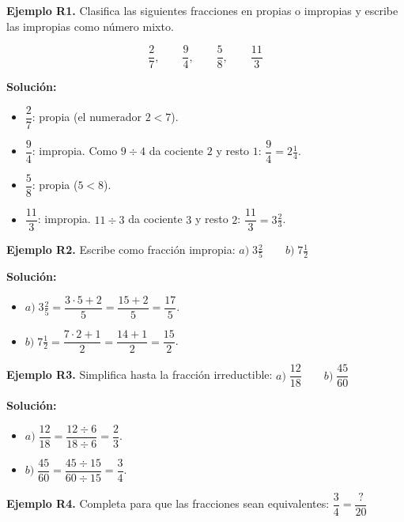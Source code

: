 \documentclass[12pt, letterpaper]{article}
\begin{document}
\textbf{Ejemplo R1.} Clasifica las siguientes fracciones en propias o impropias y escribe las impropias como número mixto.

$$\frac{2}{7}, \qquad \frac{9}{4}, \qquad \frac{5}{8}, \qquad \frac{11}{3}$$

\begin{cuadrosolucion}
  \textbf{Solución:}
  \begin{itemize}
    \item $\dfrac{2}{7}$: propia (el numerador $2 < 7$).
    \item $\dfrac{9}{4}$: impropia. Como $9 \div 4$ da cociente $2$ y resto $1$: $\dfrac{9}{4} = 2\frac{1}{4}$.
    \item $\dfrac{5}{8}$: propia ($5 < 8$).
    \item $\dfrac{11}{3}$: impropia. $11 \div 3$ da cociente $3$ y resto $2$: $\dfrac{11}{3} = 3\frac{2}{3}$.
  \end{itemize}
\end{cuadrosolucion}

\textbf{Ejemplo R2.} Escribe como fracción impropia: $a) \; 3\frac{2}{5} \qquad b) \; 7\frac{1}{2}$

\begin{cuadrosolucion}
  \textbf{Solución:}
  \begin{itemize}
    \item $a) \; 3\frac{2}{5} = \dfrac{3 \cdot 5 + 2}{5} = \dfrac{15 + 2}{5} = \dfrac{17}{5}$.
    \item $b) \; 7\frac{1}{2} = \dfrac{7 \cdot 2 + 1}{2} = \dfrac{14 + 1}{2} = \dfrac{15}{2}$.
  \end{itemize}
\end{cuadrosolucion}

\newpage %

\textbf{Ejemplo R3.} Simplifica hasta la fracción irreductible: $a) \; \dfrac{12}{18} \qquad b) \; \dfrac{45}{60}$

\begin{cuadrosolucion}
  \textbf{Solución:}
  \begin{itemize}
    \item $a) \; \dfrac{12}{18} = \dfrac{12 \div 6}{18 \div 6} = \dfrac{2}{3}$.
    \item $b) \; \dfrac{45}{60} = \dfrac{45 \div 15}{60 \div 15} = \dfrac{3}{4}$.
  \end{itemize}
\end{cuadrosolucion}

\textbf{Ejemplo R4.} Completa para que las fracciones sean equivalentes: $\dfrac{3}{4} = \dfrac{?}{20}$
\end{document}
